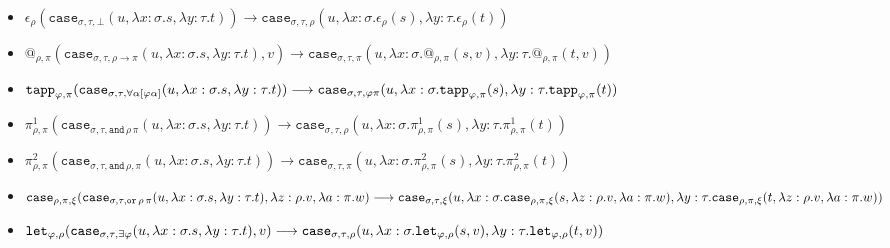 \documentclass[runningheads,a4paper]{llncs}
\newcommand{\quant}[2]{\forall #1[#2]}
\newcommand{\red}{\longrightarrow}
\newcommand{\arrtype}{\rightarrow}
\newcommand{\abs}[2]{\lambda #1.#2}
\begin{document}
\begin{itemize}
\item $
\epsilon_\rho(\mathtt{case}_{\sigma,\tau,\bot}(u,\abs{x:\sigma}{s},\abs{y:\tau}{t}))
  \red
  \mathtt{case}_{\sigma,\tau,\rho}(u,\abs{x:\sigma}{\epsilon_\rho(s)},
  \abs{y:\tau}{\epsilon_\rho(t)}) $%
\item $
@_{\rho,\pi}(\mathtt{case}_{\sigma,\tau,\rho \arrtype \pi}(u,
  \abs{x:\sigma}{s},\abs{y:\tau}{t}),v) %
  \red
  \mathtt{case}_{\sigma,\tau,\pi}(u,
  \abs{x:\sigma}{@_{\rho,\pi}(s,v)},\abs{y:\tau}{@_{\rho,\pi}(t,v)}) $%
\item $
\mathtt{tapp}_{\varphi,\pi}(\mathtt{case}_{\sigma,\tau,
  \quant{\alpha}{\varphi\alpha}}(u,\abs{x:\sigma}{s},\abs{y:\tau}{t})) %
  \red
  \mathtt{case}_{\sigma,\tau,\varphi\pi}(u,
  \abs{x:\sigma}{\mathtt{tapp}_{\varphi,\pi}(s)},\\
  \abs{y:\tau}{\mathtt{tapp}_{\varphi,\pi}(t)}) $%
\item $
\pi^1_{\rho,\pi}(\mathtt{case}_{\sigma,\tau,\mathtt{and}\,\rho\,\pi}(u,
\abs{x:\sigma}{s},\abs{y:\tau}{t})) %
  \red
  \mathtt{case}_{\sigma,\tau,\rho}(u,\abs{x:\sigma}{\pi^1_{\rho,\pi}(s)},
  \abs{y:\tau}{\pi^1_{\rho,\pi}(t)}) $%
\item $
\pi^2_{\rho,\pi}(\mathtt{case}_{\sigma,\tau,\mathtt{and}\,\rho,\pi}(u,
  \abs{x:\sigma}{s},\abs{y:\tau}{t})) %
  \red
  \mathtt{case}_{\sigma,\tau,\pi}(u,\abs{x:\sigma}{\pi^2_{\rho,\pi}(s)},
  \abs{y:\tau}{\pi^2_{\rho,\pi}(t)}) $%
\item $
\mathtt{case}_{\rho,\pi,\xi}(\mathtt{case}_{\sigma,\tau,\mathtt{or}\,
  \rho\,\pi}(u,\abs{x:\sigma}{s},\abs{y:\tau}{t}),\abs{z:\rho}{v},\abs{a:\pi}{w}) %
  \red\\
  \mathtt{case}_{\sigma,\tau,\xi}(u,
    \abs{x:\sigma}{\mathtt{case}_{\rho,\pi,\xi}(s,\abs{z:\rho}{v},\abs{a:\pi}{w})},
    \abs{y:\tau}{\mathtt{case}_{\rho,\pi,\xi}(t,\abs{z:\rho}{v},\abs{a:\pi}{w})}) $%
\item $
    \mathtt{let}_{\varphi,\rho}(
  \mathtt{case}_{\sigma,\tau,\exists\varphi}(
  u,\abs{x:\sigma}{s},\abs{y:\tau}{t}),v) %
  \red\\
  \mathtt{case}_{\sigma,\tau,\rho}(u,
  \abs{x:\sigma}{\mathtt{let}_{\varphi,\rho}(s,v)},
  \abs{y:\tau}{\mathtt{let}_{\varphi,\rho}(t,v)})
  $%
\end{itemize}
\end{document}

